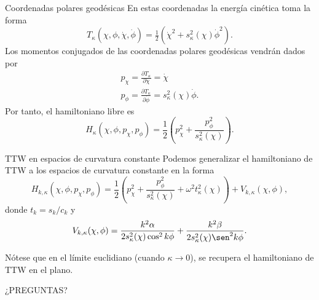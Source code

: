 \documentclass[aspectratio=169,mathserif]{beamer}
\begin{document}
 \begin{frame}{Coordenadas polares geodésicas}
  En estas coordenadas la energía cinética toma la forma
  \begin{equation*}
    T_{\kappa}(\chi,\phi,\dot{\chi},\dot{\phi})=\tfrac{1}{2}(\dot{\chi}^2+s_{\kappa}^2(\chi)\dot{\phi}^2).
  \end{equation*}
  \pause
 Los momentos conjugados de las coordenadas polares geodésicas vendrán dados por
 \begin{align*}
   p_{\chi}=\frac{\partial T_{\kappa}}{\partial \dot{\chi}}= \dot{\chi} \\
   p_{\phi}=\frac{\partial T_{\kappa}}{\partial \dot{\phi}}= s_\kappa^2(\chi)\dot{\phi}. 
 \end{align*}
  \pause
 Por tanto, el hamiltoniano libre es
 \begin{equation*}
   H_{\kappa}(\chi,\phi,p_\chi,p_\phi)=\frac{1}{2}\left( p_{\chi}^2 + \frac{p_\phi ^2}{s_\kappa^2(\chi)} \right).
 \end{equation*}
  
 \end{frame}

 \begin{frame}{TTW en espacios de curvatura constante}
   Podemos generalizar el hamiltoniano de TTW a los espacios de curvatura constante en la forma
   \begin{equation*}
     H_{k,\kappa}(\chi,\phi,p_\chi,p_\phi)=\frac{1}{2}\left( p_\chi^2+ \frac{p_\phi^2}{s^2_{\kappa}(\chi)}+\omega^2 t^2_{\kappa}(\chi) \right)+V_{k,\kappa}(\chi,\phi),
   \end{equation*}
   donde $t_k=s_k/c_k$ y
   \begin{equation*}
     V_{k,\kappa}(\chi,\phi)=\frac{k^2 \alpha}{2s_{\kappa}^2(\chi)\cos^2k\phi}+\frac{k^2 \beta}{2s_{\kappa}^2(\chi)\sen^2k\phi}.
   \end{equation*}

  \pause
   Nótese que en el límite euclidiano (cuando $\kappa\rightarrow 0$), se recupera el hamiltoniano de TTW en el plano.
 \end{frame}

 \begin{frame}
   \centering
   \Huge ¿PREGUNTAS?
 \end{frame}
\end{document}
